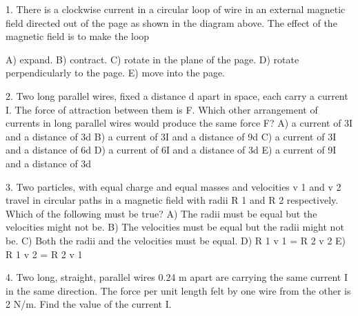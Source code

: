 






1.
There is a clockwise current in a circular loop of wire in an
external magnetic field directed out of the page as shown in
the diagram above. The effect of the magnetic field is to
make the loop

A) expand.
B) contract.
C) rotate in the plane of the page.
D) rotate perpendicularly to the page.
E) move into the page.

2. Two long parallel wires, fixed a distance d apart in space,
each carry a current I. The force of attraction between them
is F. Which other arrangement of currents in long parallel
wires would produce the same force F?
A) a current of 3I and a distance of 3d
B) a current of 3I and a distance of 9d
C) a current of 3I and a distance of 6d
D) a current of 6I and a distance of 3d
E) a current of 9I and a distance of 3d


3. Two particles, with equal charge and equal masses and
velocities v 1 and v 2 travel in circular paths in a magnetic
field with radii R 1 and R 2 respectively. Which of the
following must be true?
A) The radii must be equal but the velocities might not be.
B) The velocities must be equal but the radii might not be.
C) Both the radii and the velocities must be equal.
D) R 1 v 1 = R 2 v 2
E) R 1 v 2 = R 2 v 1


4. Two long, straight, parallel wires 0.24 m apart are carrying
the same current I in the same direction. The force per unit
length felt by one wire from the other is 2 N/m. Find the
value of the current I.

